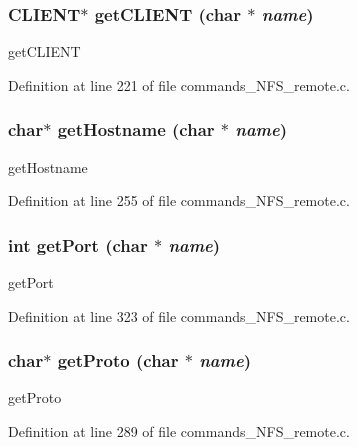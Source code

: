 \subsubsection[{getCLIENT}]{\setlength{\rightskip}{0pt plus 5cm}CLIENT$\ast$ getCLIENT (char $\ast$ {\em name})}\label{commands__NFS__remote_8c_31a2d10d287ce85cad60a6731d5630f2}


getCLIENT 

Definition at line 221 of file commands\_\-NFS\_\-remote.c.
\subsubsection[{getHostname}]{\setlength{\rightskip}{0pt plus 5cm}char$\ast$ getHostname (char $\ast$ {\em name})}\label{commands__NFS__remote_8c_7f19a0cd19fad157b921ce4002a5b8fb}


getHostname 

Definition at line 255 of file commands\_\-NFS\_\-remote.c.
\subsubsection[{getPort}]{\setlength{\rightskip}{0pt plus 5cm}int getPort (char $\ast$ {\em name})}\label{commands__NFS__remote_8c_ecc4073ed5d4285fc54cbb30ffd0d778}


getPort 

Definition at line 323 of file commands\_\-NFS\_\-remote.c.
\subsubsection[{getProto}]{\setlength{\rightskip}{0pt plus 5cm}char$\ast$ getProto (char $\ast$ {\em name})}\label{commands__NFS__remote_8c_df6ab2b25dce11f57a22c92654602f20}


getProto 

Definition at line 289 of file commands\_\-NFS\_\-remote.c.
